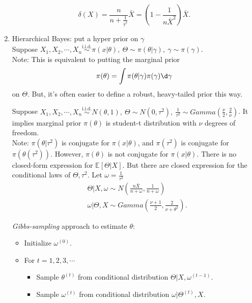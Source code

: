 \documentclass[a4paper]{article}
\begin{document}
\begin{answer}
\begin{enumerate}
\begin{eg}
			\begin{equation}
				\delta(X) = \frac{n}{n + \frac{1}{\hat{\tau}^2}} \bar{X} = \left(1 - \frac{1}{n\bar{X}^2}\right) \bar{X}.
			\end{equation}
		\end{eg}
		\item Hierarchical Bayes: put a hyper prior on $\gamma$\\
		Suppose $X_1,X_2,\cdots,X_n \stackrel{\text{i.i.d.}}{\sim} \pi(x|\theta), \ \Theta \sim \pi(\theta|\gamma), \ \gamma \sim \pi(\gamma)$. \\
		Note: This is equivalent to putting the marginal prior
		\begin{equation*}
			\pi(\theta) = \int \pi(\theta|\gamma) \pi(\gamma) \d \gamma
		\end{equation*}
		on $\Theta$. But, it's often easier to define a robust, heavy-tailed prior this way.
		\begin{eg}
			Suppose $X_1,X_2,\cdots,X_n \stackrel{\text{i.i.d.}}{\sim} N(\theta,1), \ \Theta \sim N(0,\tau^2), \ \frac{1}{\tau^2} \sim Gamma(\frac{\nu}{2},\frac{2}{\nu})$. It implies marginal prior $\pi(\theta)$ is student-t distribution with $\nu$ degrees of freedom.\\
			Note: $\pi(\theta|\tau^2)$ is conjugate for $\pi(x|\theta)$, and $\pi(\tau^2)$ is conjugate for $\pi(\theta(\tau^2))$. However, $\pi(\theta)$ is not conjugate for $\pi(x|\theta)$. There is no closed-form expression for $\mathbb{E}[\Theta|X]$. But there are closed expression for the conditional laws of $\Theta,\tau^2$. Let $\omega = \frac{1}{\tau^2}$
			\begin{equation}
				\begin{aligned}
					& \Theta|X,\omega \sim N\left(\frac{n\bar{X}}{n + \omega},\frac{1}{n + \omega}\right) \\
					& \omega | \Theta,X \sim Gamma\left(\frac{\nu + 1}{2},\frac{2}{\nu + \theta^2}\right).
				\end{aligned}
			\end{equation}
		\end{eg}
		\emph{Gibbs-sampling} approach to estimate $\theta$:
		\begin{itemize}
			\item Initialize $\omega^{(0)}$.
			\item For $t = 1,2,3,\cdots$
				\begin{itemize}
					\item Sample $\theta^{(t)}$ from conditional distribution $\Theta|X,\omega^{(t-1)}$.
					\item Sample $\omega^{(t)}$ from conditional distribution $\omega | \Theta^{(t)},X$.

\end{itemize}
\end{itemize}
\end{enumerate}
\end{answer}
\end{document}
